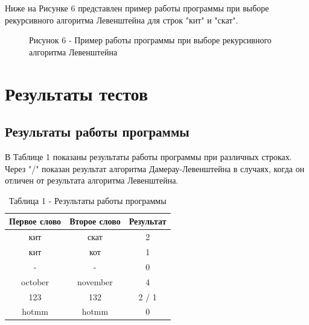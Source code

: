 \documentclass[12pt]{report}
\begin{document}
Ниже на Рисунке 6 представлен пример работы программы при выборе рекурсивного алгоритма Левенштейна для строк "кит" и "скат".
\begin{figure}[h!]
	\caption*{Рисунок 6 - Пример работы программы при выборе рекурсивного алгоритма Левенштейна}
\end{figure}

\newpage
\section{Результаты тестов}
\subsection{Результаты работы программы}

В Таблице 1 показаны результаты работы программы при различных строках. Через "/" показан результат алгоритма Дамерау-Левенштейна в случаях, когда он отличен от результата алгоритма Левенштейна.
\begin{table}[h]
	\caption*{Таблица 1 - Результаты работы программы}
	\begin{center}
		\begin{tabular}{|c c c|}
			\hline
			Первое слово & Второе слово & Результат \\ [0.5ex]
			\hline
			кит & скат & 2\\
			кит & кот & 1\\
			- & - & 0\\
			october & november & 4\\
			123 & 132 & 2 / 1\\
			hotmm & hotmm & 0\\
			\hline
		\end{tabular}
	\end{center}
\end{table}
\end{document}
